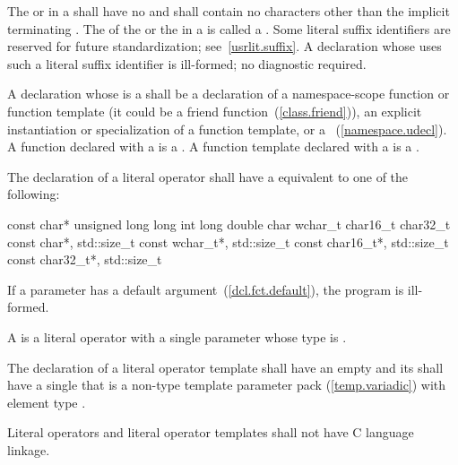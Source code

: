 \pnum
The  or 
in a  shall have no
 and shall contain no characters other than the
implicit terminating .
The  of the  or
the  in a  is called a
.
Some literal suffix identifiers are reserved for future standardization;
see~\ref{usrlit.suffix}.  A declaration whose  uses
such a literal suffix identifier is ill-formed; no diagnostic required.

\pnum
A declaration whose  is a
 shall be a declaration of a namespace-scope
function or function template (it could be a friend
function~(\ref{class.friend})), an explicit instantiation or specialization of a
function template, or a ~(\ref{namespace.udecl}).
A function declared with a  is a . A function template declared with a 
is a .

\pnum
The declaration of a literal operator shall have a
 equivalent to one of the following:

\begin{codeblock}
const char*
unsigned long long int
long double
char
wchar_t
char16_t
char32_t
const char*, std::size_t
const wchar_t*, std::size_t
const char16_t*, std::size_t
const char32_t*, std::size_t
\end{codeblock}

If a parameter has a default argument~(\ref{dcl.fct.default}), the program is
ill-formed.

\pnum
A  is a literal operator with a single parameter
whose type is .

\pnum
The declaration of a literal operator template shall have an empty
 and its
 shall have a single
 that is a non-type template parameter
pack (\ref{temp.variadic}) with element type .

\pnum
Literal operators and literal operator templates shall not have C language linkage.

